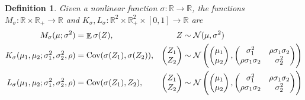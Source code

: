 \documentclass[oneside, article]{memoir}
\newtheorem{definition}{Definition}
\DeclareMathOperator{\expect}{\mathbb{E}}
\DeclareMathOperator{\Cov}{\operatorname{Cov}}
\begin{document}
\begin{definition}
  \label{def:moment-maps}
  Given a nonlinear function \(\sigma: \mathbb{R} \to \mathbb R\),
  the functions \(M_\sigma: \mathbb{R}  \times \mathbb{R}_+ \to
  \mathbb{R}\) and \(K_\sigma, L_\sigma: \mathbb{R}^2 \times \mathbb
  R_+^2 \times [0, 1] \to \mathbb{R}\) are
  \begin{align*}
    M_\sigma(\mu; \sigma^2) &= \expect{\sigma(Z)},
    & Z &\sim \mathcal N(\mu, \sigma^2)
    \\
    K_\sigma(\mu_1, \mu_2; \sigma_1^2, \sigma_2^2, \rho) &= \Cov
    (\sigma(Z_1), \sigma(Z_2)),
    &
    \begin{pmatrix}
      Z_1 \\ Z_2
    \end{pmatrix} &\sim \mathcal N\del{
      \begin{pmatrix}
        \mu_1 \\ \mu_2
      \end{pmatrix},
      \begin{pmatrix}
        \sigma_1^2 & \rho \sigma_1 \sigma_2 \\
        \rho \sigma_1 \sigma_2 & \sigma_2^2
      \end{pmatrix}
    }
    \\
    L_\sigma(\mu_1, \mu_2; \sigma_1^2, \sigma_2^2, \rho) &= \Cov
    (\sigma(Z_1), Z_2),
    &
    \begin{pmatrix}
      Z_1 \\ Z_2
    \end{pmatrix} &\sim \mathcal N\del{
      \begin{pmatrix}
        \mu_1 \\ \mu_2
      \end{pmatrix},
      \begin{pmatrix}
        \sigma_1^2 & \rho \sigma_1 \sigma_2 \\
        \rho \sigma_1 \sigma_2 & \sigma_2^2
      \end{pmatrix}
    }
    \\
  \end{align*}
\end{definition}

\end{document}
